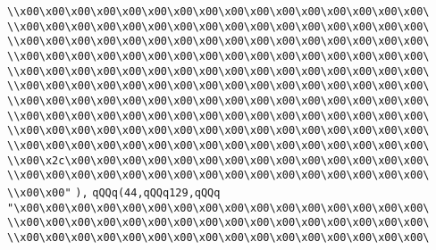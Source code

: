 \verb|\\x00\x00\x00\x00\x00\x00\x00\x00\x00\x00\x00\x00\x00\x00\x00\x00\|\newline
\verb|\\x00\x00\x00\x00\x00\x00\x00\x00\x00\x00\x00\x00\x00\x00\x00\x00\|\newline
\verb|\\x00\x00\x00\x00\x00\x00\x00\x00\x00\x00\x00\x00\x00\x00\x00\x00\|\newline
\verb|\\x00\x00\x00\x00\x00\x00\x00\x00\x00\x00\x00\x00\x00\x00\x00\x00\|\newline
\verb|\\x00\x00\x00\x00\x00\x00\x00\x00\x00\x00\x00\x00\x00\x00\x00\x00\|\newline
\verb|\\x00\x00\x00\x00\x00\x00\x00\x00\x00\x00\x00\x00\x00\x00\x00\x00\|\newline
\verb|\\x00\x00\x00\x00\x00\x00\x00\x00\x00\x00\x00\x00\x00\x00\x00\x00\|\newline
\verb|\\x00\x00\x00\x00\x00\x00\x00\x00\x00\x00\x00\x00\x00\x00\x00\x00\|\newline
\verb|\\x00\x00\x00\x00\x00\x00\x00\x00\x00\x00\x00\x00\x00\x00\x00\x00\|\newline
\verb|\\x00\x00\x00\x00\x00\x00\x00\x00\x00\x00\x00\x00\x00\x00\x00\x00\|\newline
\verb|\\x00\x2c\x00\x00\x00\x00\x00\x00\x00\x00\x00\x00\x00\x00\x00\x00\|\newline
\verb|\\x00\x00\x00\x00\x00\x00\x00\x00\x00\x00\x00\x00\x00\x00\x00\x00\|\newline
\verb|\\x00\x00"|\newline
\verb|),|\newline
\verb|qQQq(44,qQQq129,qQQq|\newline
\verb|"\x00\x00\x00\x00\x00\x00\x00\x00\x00\x00\x00\x00\x00\x00\x00\x00\|\newline
\verb|\\x00\x00\x00\x00\x00\x00\x00\x00\x00\x00\x00\x00\x00\x00\x00\x00\|\newline
\verb|\\x00\x00\x00\x00\x00\x00\x00\x00\x00\x00\x00\x00\x00\x00\x00\x00\|\newline
